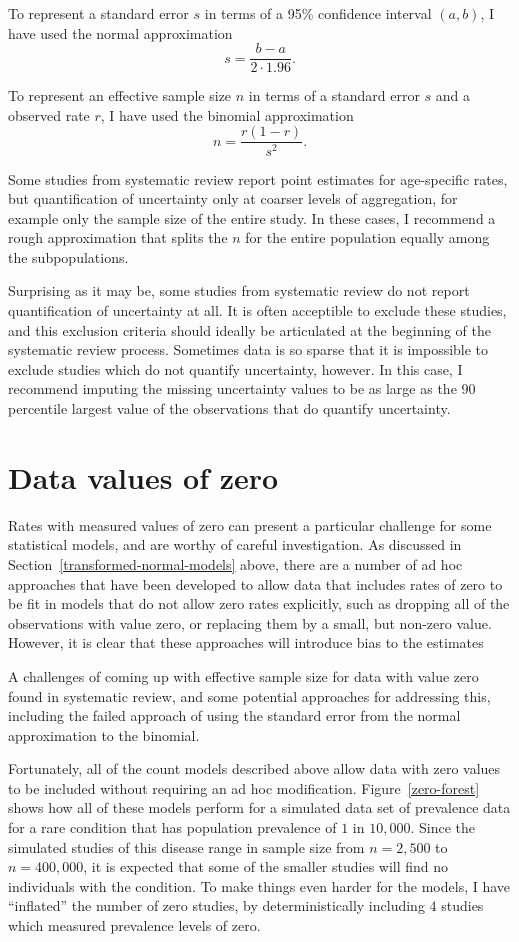 To represent a standard error $s$ in terms of a 95\% confidence
interval $(a,b)$, I have used the normal approximation
\[
s = \frac{b-a}{2\cdot 1.96}.
\]

To represent an effective sample size $n$ in terms of a standard error $s$
and a observed rate $r$, I have used the binomial approximation
\[
n = \frac{r(1-r)}{s^2}.
\]

Some studies from systematic review report point estimates for
age-specific rates, but quantification of uncertainty only at coarser
levels of aggregation, for example only the sample size of the entire
study.  In these cases, I recommend a rough approximation that splits
the $n$ for the entire population equally among the subpopulations.

Surprising as it may be, some studies from systematic review do not
report quantification of uncertainty at all.  It is often acceptible
to exclude these studies, and this exclusion criteria should ideally
be articulated at the beginning of the systematic review process.
Sometimes data is so sparse that it is impossible to exclude studies
which do not quantify uncertainty, however.  In this case, I recommend
imputing the missing uncertainty values to be as large as the 90
percentile largest value of the observations that do quantify
uncertainty.


\section{Data values of zero}
Rates with measured values of zero can present a particular challenge
for some statistical models, and are worthy of careful
investigation. As discussed in Section~\ref{transformed-normal-models}
above, there are a number of ad hoc approaches that have been
developed to allow data that includes rates of zero to be fit in
models that do not allow zero rates explicitly, such as dropping all
of the observations with value zero, or replacing them by a small, but
non-zero value. However, it is clear that these approaches will
introduce bias to the estimates \cite{refs TK}

A challenges of coming up with effective sample size for data with
value zero found in systematic review, and some potential approaches
for addressing this, including the failed approach of using the
standard error from the normal approximation to the binomial.

Fortunately, all of the count models described above allow data with
zero values to be included without requiring an ad hoc
modification. Figure~\ref{zero-forest} shows how all of these models
perform for a simulated data set of prevalence data for a rare
condition that has population prevalence of $1$ in $10,000$.  Since
the simulated studies of this disease range in sample size from
$n=2,500$ to $n=400,000$, it is expected that some of the smaller
studies will find no individuals with the condition. To make things
even harder for the models, I have ``inflated'' the number of zero
studies, by deterministically including $4$ studies which measured
prevalence levels of zero.

